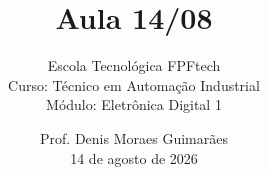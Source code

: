 
\title{Aula 14/08}

\subtitle{
\vspace{1.0cm}
Escola Tecnológica FPFtech\\
\vspace{0.5cm}
Curso: Técnico em Automação Industrial\\
\vspace{0.5cm}
Módulo: Eletrônica Digital 1
\vspace{1.0cm}
}

\author{
Prof. Denis Moraes Guimarães\\
\small 14 de agosto de 2026
}

\date{}
